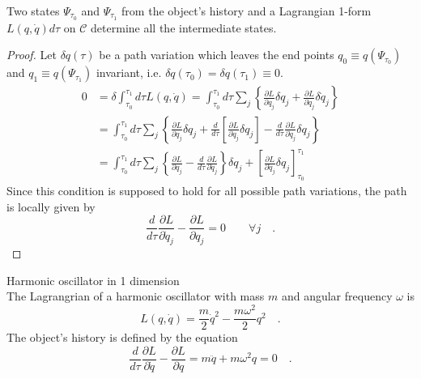 \begin{theorem}
Two states $\Psi_{\tau_0}$ and $\Psi_{\tau_1}$ from the object's history and a Lagrangian 1-form $L(q,\dot{q})d\tau$ on $\mathcal{C}$ determine all the intermediate states.
\begin{proof}
Let $\delta q(\tau)$ be a path variation which leaves the end points $q_0\equiv q(\Psi_{\tau_0})$ and $q_1\equiv q(\Psi_{\tau_1})$ invariant, i.e. $\delta q(\tau_{0})=\delta q(\tau_{1})\equiv 0$.
\begin{equation}
\begin{split}
0&=\delta\int_{\tau_0}^{\tau_1}d\tau L(q,\dot{q})=\int_{\tau_0}^{\tau_1}d\tau\sum_j\left\{\frac{\partial L}{\partial q_j}\delta q_j+\frac{\partial L}{\partial \dot{q}_j}\delta\dot{q}_j\right\}\\
&=\int_{\tau_0}^{\tau_1}d\tau\sum_j\left\{\frac{\partial L}{\partial q_j}\delta q_j+\frac{d}{d\tau}\left[\frac{\partial L}{\partial\dot{q}_j}\delta q_j\right]-\frac{d}{d\tau}\frac{\partial L}{\partial \dot{q}_j}\delta q_j\right\}\\
&=\int_{\tau_0}^{\tau_1}d\tau\sum_j\left\{\frac{\partial L}{\partial q_j}-\frac{d}{d\tau}\frac{\partial L}{\partial \dot{q}_j}\right\}\delta q_j+\left[\frac{\partial L}{\partial\dot{q}_j}\delta q_j\right]_{\tau_0}^{\tau_1}\nonumber
\end{split}
\end{equation}
Since this condition is supposed to hold for all possible path variations, the path is locally given by
\begin{equation}
\frac{d}{d\tau}\frac{\partial L}{\partial \dot{q}_j}-\frac{\partial L}{\partial q_j}=0\qquad \forall j\quad.
\end{equation}
\end{proof}
\begin{example}
Harmonic oscillator in 1 dimension\\
The Lagrangrian of a harmonic oscillator with mass $m$ and angular frequency $\omega$ is
\begin{equation}
L(q,\dot{q}) = \frac{m}{2}\dot{q}^2-\frac{m\omega^2}{2}q^2\quad.\nonumber
\end{equation}
The object's history is defined by the equation
\begin{equation}
\frac{d}{d\tau}\frac{\partial L}{\partial \dot{q}}-\frac{\partial L}{\partial q} = m\ddot{q}+m\omega^2q=0\quad.\nonumber
\end{equation}
\end{example}
\end{theorem}
